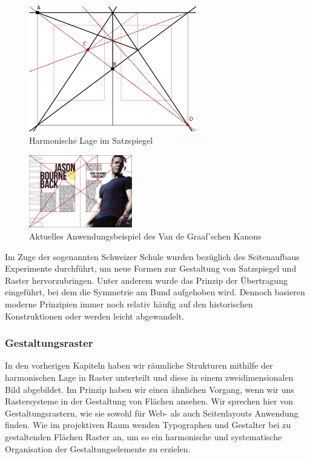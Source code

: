 \documentclass[12pt,a4paper]{article}
\begin{document}
\begin{figure}[htbp]
\centering
\includegraphics[width=0.65\textwidth]{Bilder/Van_de_Graaf.png}
\caption{Harmonische Lage im Satzspiegel}
\label{fig:harmVDG}
\end{figure}

\begin{figure}
\includegraphics[width=0.4\textwidth]{Bilder/jsonBourne2.jpg}
\caption{Aktuelles Anwendungsbeispiel des Van de Graaf'schen Kanons \protect\footnotemark[7]}
\label{fig:modernSatz}
\end{figure}


Im Zuge der sogenannten Schweizer Schule wurden bezüglich des Seitenaufbaus Experimente durchführt, um neue Formen zur Gestaltung von Satzspiegel und Raster hervorzubringen. Unter anderem wurde das Prinzip der Übertragung eingeführt, bei dem die Symmetrie am Bund aufgehoben wird. Dennoch basieren moderne Prinzipien immer noch relativ häufig auf den historischen Konstruktionen oder werden leicht abgewandelt.

\newpage
\subsubsection{Gestaltungsraster}
In den vorherigen Kapiteln haben wir räumliche Strukturen mithilfe der harmonischen Lage in Raster unterteilt und diese in einem zweidimensionalen Bild abgebildet. Im Prinzip haben wir einen ähnlichen Vorgang, wenn wir uns Rastersysteme in der Gestaltung von Flächen ansehen. Wir sprechen hier von Gestaltungsrastern, wie sie sowohl für Web- als auch Seitenlayouts Anwendung finden. Wie im projektiven Raum wenden Typographen und Gestalter bei zu gestaltenden Flächen Raster an, um so ein harmonische und systematische Organisation der Gestaltungselemente zu erzielen.
\end{document}
